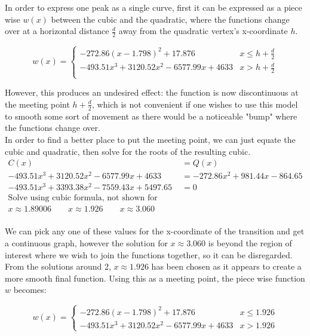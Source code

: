 \documentclass[12pt, a4paper]{article}
\begin{document}
In order to express one peak as a single curve, first it can be expressed as a
piece wise $w(x)$ between the cubic and the quadratic, where the functions change
over at a horizontal distance $\frac{d}{2}$ away from the quadratic vertex's
x-coordinate $h$.

\[ w(x)= \begin{cases} -272.86(x-1.798)^2+17.876 & x \leq h + \frac{d}{2}\\
    -493.51x^3+3120.52x^2-6577.99x+4633 & x > h + \frac{d}{2} \\
\end{cases}
\]

However, this produces an undesired effect: the function is now discontinuous at
the meeting point $h+\frac{d}{2}$, which is not convenient if one wishes to use
this model to smooth some sort of movement as there would be a noticeable "bump"
where the functions change over. \\

In order to find a better place to put the meeting point, we can just equate the
cubic and quadratic, then solve for the roots of the resulting cubic. \\

\begin{align*}
    C(x) &= Q(x) \\
    -493.51x^3+3120.52x^2-6577.99x+4633 &= -272.86x^2 + 981.44x -864.65 \\
    -493.51 x^3 + 3393.38 x^2 - 7559.43 x + 5497.65 &= 0 \\
    \text{Solve using cubic formula, not shown for brevity} \\
    x \approx 1.89006 \qquad x \approx 1.926 \qquad x \approx 3.060\\
\end{align*}

We can pick any one of these values for the x-coordinate of the transition and
get a continuous graph, however the solution for $x \approx 3.060$ is beyond the
region of interest where we wish to join the functions together, so it can be
disregarded. From the solutions around 2, $x \approx 1.926$ has been chosen as
it appears to create a more smooth final function. Using this as a meeting
point, the piece wise function $w$ becomes:

\[ w(x)= \begin{cases} 
    -272.86(x-1.798)^2+17.876 & x \leq 1.926 \\
    -493.51x^3+3120.52x^2-6577.99x+4633 & x > 1.926
\end{cases}
\]
\end{document}
